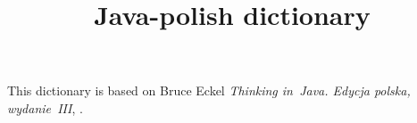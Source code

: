 \documentclass[a4paper,11pt]{article}
\title{Java-polish dictionary}
\begin{document}





\maketitle





This dictionary is based on Bruce Eckel \textit{Thinking in~Java. Edycja
  polska, wydanie~III},
\parencite{Eckel-Thinking-in-Java-Ed-polska-Wyd-III-Pub-2003}.

\vspace{1.5em}
\end{document}
